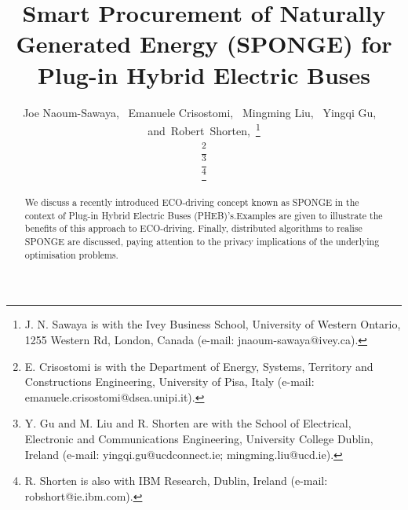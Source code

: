 \documentclass[journal]{IEEEtran}
\begin{document}
\title{Smart Procurement of Naturally Generated Energy (SPONGE) for Plug-in Hybrid Electric Buses}




\author{Joe Naoum-Sawaya,~
        Emanuele Crisostomi,~
        Mingming Liu,~
        Yingqi Gu, ~
        and~Robert~Shorten,~\thanks{J. N. Sawaya is with the Ivey Business School, University of Western Ontario, 1255 Western Rd, London, Canada (e-mail: jnaoum-sawaya@ivey.ca).}
	
	\thanks{E. Crisostomi is with the Department of Energy, Systems, Territory and Constructions Engineering, University of Pisa, Italy (e-mail: emanuele.crisostomi@dsea.unipi.it).}
	
	\thanks{Y. Gu and M. Liu and R. Shorten are with the School of Electrical, Electronic and Communications Engineering, University College Dublin, Ireland (e-mail: yingqi.gu@ucdconnect.ie; mingming.liu@ucd.ie).}
	
	\thanks{R. Shorten is also with IBM Research, Dublin, Ireland (e-mail: robshort@ie.ibm.com).}}



















\maketitle


\begin{abstract}
We discuss a recently introduced  ECO-driving concept known as SPONGE in the context of Plug-in Hybrid Electric Buses (PHEB)'s.Examples are given to illustrate the benefits of this approach to ECO-driving. Finally, distributed algorithms to realise SPONGE are discussed, paying attention to the privacy implications of the underlying optimisation problems.
\end{abstract}
\end{document}
